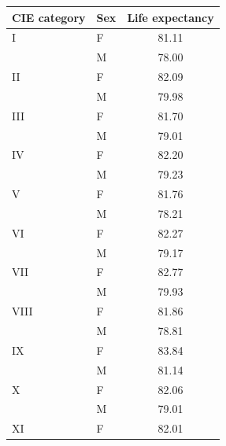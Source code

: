 \begin{tabular}{llc}
\toprule[1.5 pt]
\textbf{CIE category} & \textbf{Sex} & \textbf{Life expectancy} \\
\midrule
I                  & F             & 81.11                               \\
                   & M             & 78.00                               \\
II                 & F             & 82.09                               \\
                   & M             & 79.98                               \\
III                & F             & 81.70                               \\
                   & M             & 79.01                               \\
IV                 & F             & 82.20                               \\
                   & M             & 79.23                               \\
V                  & F             & 81.76                               \\
                   & M             & 78.21                               \\
VI                 & F             & 82.27                               \\
                   & M             & 79.17                               \\
VII                & F             & 82.77                               \\
                   & M             & 79.93                               \\
VIII               & F             & 81.86                               \\
                   & M             & 78.81                               \\
IX                 & F             & 83.84                               \\
                   & M             & 81.14                               \\
X                  & F             & 82.06                               \\
                   & M             & 79.01                               \\
XI                 & F             & 82.01                               \\

\end{tabular}
